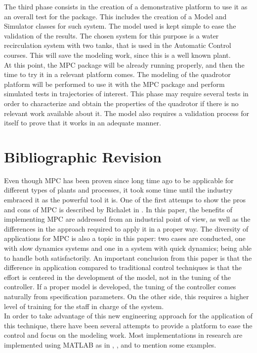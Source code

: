 The third phase consists in the creation of a demonstrative platform to use it as an overall test for the package. This includes the creation of a Model and Simulator classes for such system. The model used is kept simple to ease the validation of the results. The chosen system for this purpose is a water recirculation system with two tanks, that is used in the Automatic Control courses. This will save the modeling work, since this is a well known plant. \\

At this point, the MPC package will be already running properly, and then the time to try it in a relevant platform comes. The modeling of the quadrotor platform will be performed to use it with the MPC package and perform simulated tests in trajectories of interest. This phase may require several tests in order to characterize and obtain the properties of the quadrotor if there is no relevant work available about it. The model also requires a validation process for itself to prove that it works in an adequate manner. 

\section{Bibliographic Revision}

Even though MPC has been proven since long time ago to be applicable for different types of plants and processes, it took some time until the industry embraced it as the powerful tool it is. One of the first attemps to show the pros and cons of MPC is described  by Richalet in \cite{Richalet1993}. In this paper, the benefits of implementing MPC are addressed from an industrial point of view, as well as the differences in the approach required to apply it in a proper way. The diversity of applications for MPC is also a topic in this paper: two cases are conducted, one with slow dynamics systems and one in a system with quick dynamics; being able to handle both satisfactorily. An important conclusion from this paper is that the difference in application compared to traditional control techniques is that the effort is centered in the development of the model, not in the tuning of the controller. If a proper model is developed, the tuning of the controller comes naturally from specification parameters. On the other side, this requires a higher level of training for the staff in charge of the system.\\

In order to take advantage of this new engineering approach for the application of this technique, there have been several attempts to provide a platform to ease the control and focus on the modeling work. Most implementations in research are implemented using MATLAB\textsuperscript{\textregistered} as in \cite{Gabrielsson2012}, \cite{Molero2011}, \cite{Kristoffersson2006} and \cite{Johansson2012} to mention some examples.\\

